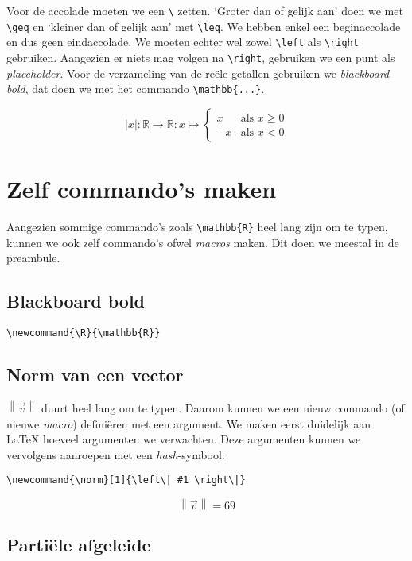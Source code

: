 \documentclass{article}
\begin{document}
	 Voor de accolade moeten we een \verb*|\| zetten. `Groter dan of gelijk aan' doen we met \verb*|\geq| en `kleiner dan of gelijk aan' met \verb*|\leq|. We hebben enkel een beginaccolade en dus geen eindaccolade. We moeten echter wel zowel \verb*|\left| als \verb*|\right| gebruiken. Aangezien er niets mag volgen na \verb*|\right|, gebruiken we een punt als \textit{placeholder}. Voor de verzameling van de reële getallen gebruiken we \textit{blackboard bold}, dat doen we met het commando \verb*|\mathbb{...}|.
	 
	 \[ |x| : \mathbb{R}\to \mathbb{R} : x \mapsto \left\{  
	 	\begin{array}{ll}
	 		x & \text{als } x \geq 0 \\
	 		-x & \text{als } x<0
	 	\end{array}
	 	\right. \]
	 	
	 	\section{Zelf commando's maken}
	 	
	 	Aangezien sommige commando's zoals \verb*|\mathbb{R}| heel lang zijn om te typen, kunnen we ook zelf commando's ofwel \textit{macros} maken. Dit doen we meestal in de preambule.
	 	
	 	\subsection{Blackboard bold}
	 	
	 	\verb*|\newcommand{\R}{\mathbb{R}}|
	 	
	 	\newcommand{\R}{\mathbb{R}}
	 	
	 	\subsection{Norm van een vector}
	 	
	 	\(  \left\| \vec{v} \right\| \) duurt heel lang om te typen. Daarom kunnen we een nieuw commando (of nieuwe \textit{macro}) definiëren met een argument. We maken eerst duidelijk aan \LaTeX{} hoeveel argumenten we verwachten. Deze argumenten kunnen we vervolgens aanroepen met een \textit{hash}-symbool: 
	 	
	 	\verb?\newcommand{\norm}[1]{\left\| #1 \right\|}?
	 	\newcommand{\norm}[1]{\left\| #1 \right\|}
	 	
	 	\[ \norm{\vec{v}} = 69 \]
	 	
	 	\newpage
	 	\subsection{Partiële afgeleide}
	 	
\end{document}
